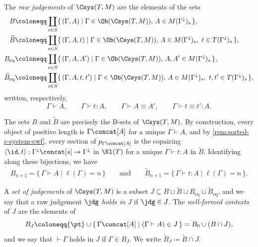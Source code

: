 \begin{definition}\label{def:raw-judgements}
    The \emph{raw judgements} of $\Csys(T, M)$ are the elements of the sets
    \begin{align*}
        B &\coloneqq \coprod_{s \in S} \{\, (\Gamma, A) \mid \Gamma \in \Ob(\Csys(T,M)),\, A \in M(\Gamma^{\downarrow})_s \,\},\\
        \widetilde{B} &\coloneqq \coprod_{s \in S} \{\, (\Gamma, A, t) \mid \Gamma \in \Ob(\Csys(T,M)),\, A \in M(\Gamma^{\downarrow})_s,\ t \in T(\Gamma^{\downarrow})_s \,\},\\
        B_{\mathrm{eq}} &\coloneqq \coprod_{s \in S} \{\, (\Gamma, A, A') \mid \Gamma \in \Ob(\Csys(T,M)),\, A, A' \in M(\Gamma^{\downarrow})_s \,\},\\
        \widetilde{B}_{\mathrm{eq}} &\coloneqq \coprod_{s \in S} \{\, (\Gamma, A, t, t') \mid \Gamma \in \Ob(\Csys(T,M)),\, A \in M(\Gamma^{\downarrow})_s,\ t, t' \in T(\Gamma^{\downarrow})_s \,\},
    \end{align*}
    written, respectively,
    \[
        \Gamma \vdash A, \qquad \Gamma \vdash t : A, \qquad \Gamma \vdash A \equiv A', \qquad \Gamma \vdash t \equiv t' : A.
    \]
\end{definition}

The sets $B$ and $\widetilde{B}$ are precisely the B-sets of $\Csys(T, M)$. By construction, every object of positive length is $\Gamma \concat [A]$ for a unique $\Gamma \vdash A$, and by \cref{rem:sorted-c-system-cwf}, every section of $p_{\Gamma \concat [A]}$ is the copairing $\langle \id, t \rangle : \Gamma^{\downarrow} \concat [s] \to \Gamma^{\downarrow}$ in $\Kl(T)$ for a unique $\Gamma \vdash t : A$ in $\widetilde{B}$. Identifying along these bijections, we have
\begin{align*}
    B_{n+1} = \{\, \Gamma \vdash A \mid \ell(\Gamma) = n \,\} \;\;\;\;\;\; \text{ and } \;\;\;\;\;\;  \widetilde{B}_{n+1} = \{\, \Gamma \vdash t : A \mid \ell(\Gamma) = n \,\}.
\end{align*}

\begin{definition}\label{def:sets-of-judgements}
    A \emph{set of judgements} of $\Csys(T,M)$ is a subset $J \subseteq B \sqcup \widetilde{B} \sqcup B_{\mathrm{eq}} \sqcup \widetilde{B}_{\mathrm{eq}}$, and we say that a raw judgement $\jdg$ \emph{holds in} $J$ if $\jdg \in J$. The \emph{well-formed contexts} of $J$ are the elements of
    \[
        B_J \coloneqq \{\pt\} \cup \{\, \Gamma \concat [A] \mid (\Gamma \vdash A) \in J \,\} = B_0 \cup (B \cap J),
    \]
    and we say that $\vdash \Gamma$ holds in $J$ if $\Gamma \in B_J$. We write $\widetilde{B}_J \coloneqq \widetilde{B} \cap J$.
\end{definition}

